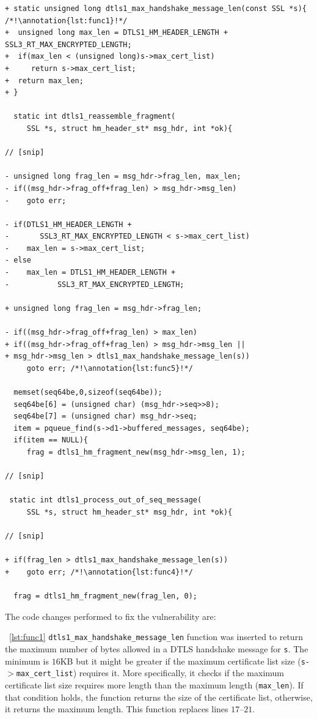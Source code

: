\documentclass[sigconf,review]{acmart}
\newcounter{lstannotation}
\renewcommand{\thelstannotation}{\ding{\number\numexpr181+\arabic{lstannotation}}}
\newcommand{\annotation}[1]{\refstepcounter{lstannotation}\label{#1}\thelstannotation}
\begin{document}
\begin{lstlisting}[style={CStyle}, caption={Fix provided by OpenSSL developers to the
\\CVE-$2014$-$3506$ vulnerability},label={lst:vuln}]
+ static unsigned long dtls1_max_handshake_message_len(const SSL *s){ /*!\annotation{lst:func1}!*/
+  unsigned long max_len = DTLS1_HM_HEADER_LENGTH + SSL3_RT_MAX_ENCRYPTED_LENGTH;
+  if(max_len < (unsigned long)s->max_cert_list)
+     return s->max_cert_list;
+  return max_len;
+ }

  static int dtls1_reassemble_fragment(
     SSL *s, struct hm_header_st* msg_hdr, int *ok){

// [snip]

- unsigned long frag_len = msg_hdr->frag_len, max_len;
- if((msg_hdr->frag_off+frag_len) > msg_hdr->msg_len)
-    goto err;

- if(DTLS1_HM_HEADER_LENGTH +
-    	SSL3_RT_MAX_ENCRYPTED_LENGTH < s->max_cert_list)
-    max_len = s->max_cert_list;
- else
-    max_len = DTLS1_HM_HEADER_LENGTH +
-   		SSL3_RT_MAX_ENCRYPTED_LENGTH;

+ unsigned long frag_len = msg_hdr->frag_len;

- if((msg_hdr->frag_off+frag_len) > max_len)
+ if((msg_hdr->frag_off+frag_len) > msg_hdr->msg_len ||
+ msg_hdr->msg_len > dtls1_max_handshake_message_len(s))
     goto err; /*!\annotation{lst:func5}!*/

  memset(seq64be,0,sizeof(seq64be));
  seq64be[6] = (unsigned char) (msg_hdr->seq>>8);
  seq64be[7] = (unsigned char) msg_hdr->seq;
  item = pqueue_find(s->d1->buffered_messages, seq64be);
  if(item == NULL){
     frag = dtls1_hm_fragment_new(msg_hdr->msg_len, 1);

// [snip]

 static int dtls1_process_out_of_seq_message(
     SSL *s, struct hm_header_st* msg_hdr, int *ok){

// [snip]

+ if(frag_len > dtls1_max_handshake_message_len(s))
+    goto err; /*!\annotation{lst:func4}!*/

  frag = dtls1_hm_fragment_new(frag_len, 0);

\end{lstlisting}

The code changes performed to fix the vulnerability are:

~\ref{lst:func1} \texttt{dtls1\_max\_handshake\_message\_len} function was
inserted to return the maximum number of bytes allowed in a DTLS
handshake message for \texttt{s}. The minimum is $16$KB but it might be greater if
the maximum certificate list size (\texttt{s-$>$max\_cert\_list}) requires it. More
specifically, it checks if the maximum certificate list size requires more length 
than the maximum length (\texttt{max\_len}). If that condition holds, the function 
returns the size of the certificate list, otherwise, it returns the maximum length. 
This function replaces lines $17$--$21$.
\end{document}
